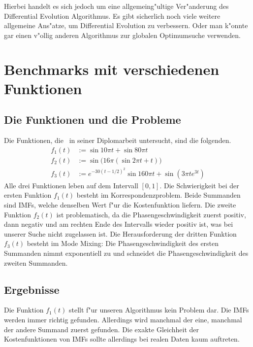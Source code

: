 \documentclass[a4paper]{scrartcl}
\begin{document}
Hierbei handelt es sich jedoch um eine allgemeing"ultige Ver"anderung des Differential Evolution Algorithmus. 
Es gibt sicherlich noch viele weitere allgemeine Ans"atze, um Differential Evolution zu verbessern. 
Oder man k"onnte gar einen v"ollig anderen Algorithmus zur globalen Optimumsuche verwenden. 


\section{Benchmarks mit verschiedenen Funktionen}

\subsection{Die Funktionen und die Probleme}

Die Funktionen, die~\citeauthor{rudi2010} in seiner Diplomarbeit \citep[S.~28--32]{rudi2010} untersucht, sind die folgenden.
\begin{align*}
f_1(t) &:= \sin 10\pi t + \sin 80\pi t \\
f_2(t) &:= \sin\big(16\pi(\sin 2\pi t+t)\big) \\
f_3(t) &:= e^{-30(t-1/2)^2}\sin 160\pi t + \sin(3\pi te^{3t})
\end{align*}
Alle drei Funktionen leben auf dem Intervall $[0,1]$. 
Die Schwierigkeit bei der ersten Funktion $f_1(t)$ besteht im Korrespondenzproblem. 
Beide Summanden sind IMFs, welche denselben Wert f"ur die Kostenfunktion liefern. 
Die zweite Funktion $f_2(t)$ ist problematisch, da die Phasengeschwindigkeit zuerst positiv, dann negativ und am rechten Ende des Intervalls wieder positiv ist, was bei unserer Suche nicht zugelassen ist. 
Die Herausforderung der dritten Funktion $f_3(t)$ besteht im Mode Mixing: Die Phasengeschwindigkeit des ersten Summanden nimmt exponentiell zu und schneidet die Phasengeschwindigkeit des zweiten Summanden. 


\subsection{Ergebnisse}

Die Funktion $f_1(t)$ stellt f"ur unseren Algorithmus kein Problem dar. 
Die IMFs werden immer richtig gefunden. 
Allerdings wird manchmal der eine, manchmal der andere Summand zuerst gefunden. 
Die exakte Gleichheit der Kostenfunktionen von IMFs sollte allerdings bei realen Daten kaum auftreten. 
\end{document}
